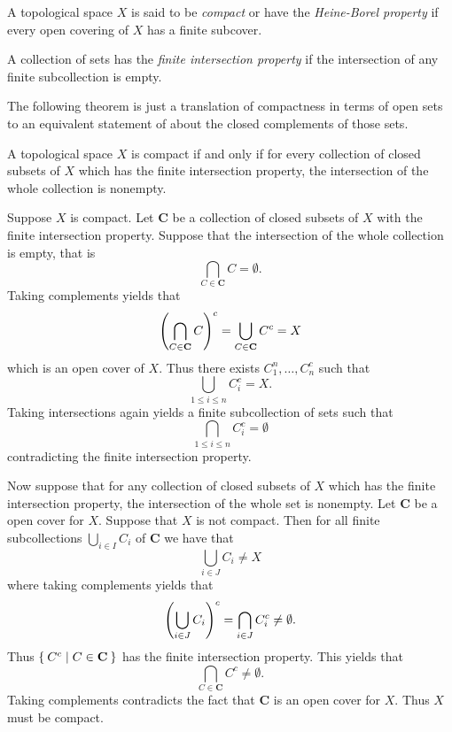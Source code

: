 \documentclass[letterpaper, 11pt, oneside]{book}
\begin{document}
\begin{defn}
  A topological space $X$ is said to be \emph{compact} or have the \emph{Heine-Borel property} if every open covering of $X$ has a finite subcover.
\end{defn}

\begin{defn}
  A collection of sets has the \emph{finite intersection property} if the intersection of any finite subcollection is empty.
\end{defn}

\clearpage

The following theorem is just a translation of compactness in terms of open sets to an equivalent statement of about the closed complements of those sets.

\begin{thrm}\label{thrm: compact_iff_nonempty_intersection}
  A topological space $X$ is compact if and only if for every collection of closed subsets of $X$ which has the finite intersection property, the intersection of the whole collection is nonempty.
\end{thrm}
\begin{pf}
  Suppose $X$ is compact.
  Let \textbf{C} be a collection of closed subsets of $X$ with the finite intersection property.
  Suppose that the intersection of the whole collection is empty, that is
  \[
    \bigcap_{C \in \textbf{C}} C = \emptyset.
  \]
  Taking complements yields that
  \[
    \pqty{\bigcap_{C \in \textbf{C}} C}^{c} = \bigcup_{C \in \textbf{C}} C^{c} = X
  \]
  which is an open cover of $X$.
  Thus there exists $C_{1}^{n}, \ldots, C_{n}^{c}$ such that
  \[
    \bigcup_{1 \leq i \leq n} C_{i}^{c} = X.
  \]
  Taking intersections again yields a finite subcollection of sets such that
  \[
    \bigcap_{1 \leq i \leq n} C_{i}^{c} = \emptyset
  \]
  contradicting the finite intersection property.

  Now suppose that for any collection of closed subsets of $X$ which has the finite intersection property, the intersection of the whole set is nonempty.
  Let \textbf{C} be a open cover for $X$.
  Suppose that $X$ is not compact.
  Then for all finite subcollections $\bigcup_{i \in I} C_{i}$ of \textbf{C} we have that
  \[
    \bigcup_{i \in J} C_{i} \neq X
  \]
  where taking complements yields that
  \[
    \pqty{\bigcup_{i \in J} C_{i}}^{c} = \bigcap_{i \in J} C_{i}^{c} \neq \emptyset.
  \]
  Thus $\Set{C^{c} | C \in \textbf{C}}$ has the finite intersection property.
  This yields that
  \[
    \bigcap_{C \in \textbf{C}} C^{c} \neq \emptyset.
  \]
  Taking complements contradicts the fact that \textbf{C} is an open cover for $X$.
  Thus $X$ must be compact.
\end{pf}
\end{document}

